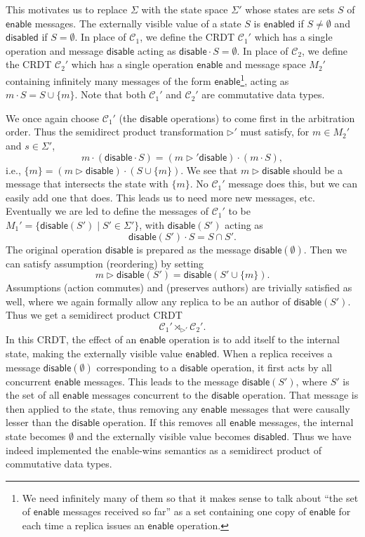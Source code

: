 \documentclass[acmsmall,nonacm]{acmart}
\newcommand{\mc}[1]{\ensuremath{\mathcal{#1}}}
\newcommand{\msf}[1]{\ensuremath{\mathsf{#1}}}
\newcommand{\act}{\triangleright}
\theoremstyle{plain}
\theoremstyle{definition}
\begin{document}
This motivates us to replace $\Sigma$ with the state space $\Sigma'$ whose states are sets $S$ of $\msf{enable}$ messages.  The externally visible value of a state $S$ is $\msf{enabled}$ if $S \neq \emptyset$ and $\msf{disabled}$ if $S = \emptyset$.  In place of $\mc{C}_1$, we define the CRDT $\mc{C}_1'$ which has a single operation and message $\msf{disable}$ acting as $\msf{disable} \cdot S = \emptyset$.  In place of $\mc{C}_2$, we define the CRDT $\mc{C}_2'$ which has a single operation $\msf{enable}$ and message space $M_2'$ containing infinitely many messages of the form $\msf{enable}$\footnote{We need infinitely many of them so that it makes sense to talk about ``the set of $\msf{enable}$ messages received so far'' as a set containing one copy of $\msf{enable}$ for each time a replica issues an $\msf{enable}$ operation.}, acting as $m \cdot S = S \cup \{m\}$.  Note that both $\mc{C}_1'$ and $\mc{C}_2'$ are commutative data types.

We once again choose $\mc{C}_1'$ (the $\msf{disable}$ operations) to come first in the arbitration order.  Thus the semidirect product transformation $\act'$ must satisfy, for $m \in M_2'$ and $s \in \Sigma'$,
\[
m \cdot (\msf{disable} \cdot S) = (m \act' \msf{disable}) \cdot (m \cdot S),
\]
i.e., $\{m\} = (m \act \msf{disable}) \cdot (S \cup \{m\})$.  We see that $m \act \msf{disable}$ should be a message that intersects the state with $\{m\}$.  No $\mc{C}_1'$ message does this, but we can easily add one that does.  This leads us to need more new messages, etc.  Eventually we are led to define the messages of $\mc{C}_1'$ to be $M_1' = \{\msf{disable}(S') \mid S' \in \Sigma'\}$, with $\msf{disable}(S')$ acting as
\[
\msf{disable}(S') \cdot S = S \cap S'.
\]
The original operation $\msf{disable}$ is prepared as the message $\msf{disable}(\emptyset)$.  Then we can satisfy assumption (reordering) by setting
\[
m \act \msf{disable}(S') = \msf{disable}(S' \cup \{m\}).
\]
Assumptions (action commutes) and (preserves authors) are trivially satisfied as well, where we again formally allow any replica to be an author of $\msf{disable}(S')$.  Thus we get a semidirect product CRDT
\[
\mc{C}_1' \rtimes_{\act'} \mc{C}_2'.
\]
In this CRDT, the effect of an $\msf{enable}$ operation is to add itself to the internal state, making the externally visible value $\msf{enabled}$.  When a replica receives a message $\msf{disable}(\emptyset)$ corresponding to a $\msf{disable}$ operation, it first acts by all concurrent $\msf{enable}$ messages.  This leads to the message $\msf{disable}(S')$, where $S'$ is the set of all $\msf{enable}$ messages concurrent to the $\msf{disable}$ operation.  That message is then applied to the state, thus removing any $\msf{enable}$ messages that were causally lesser than the $\msf{disable}$ operation.  If this removes all $\msf{enable}$ messages, the internal state becomes $\emptyset$ and the externally visible value becomes $\msf{disabled}$.  Thus we have indeed implemented the enable-wins semantics as a semidirect product of commutative data types.
\end{document}
